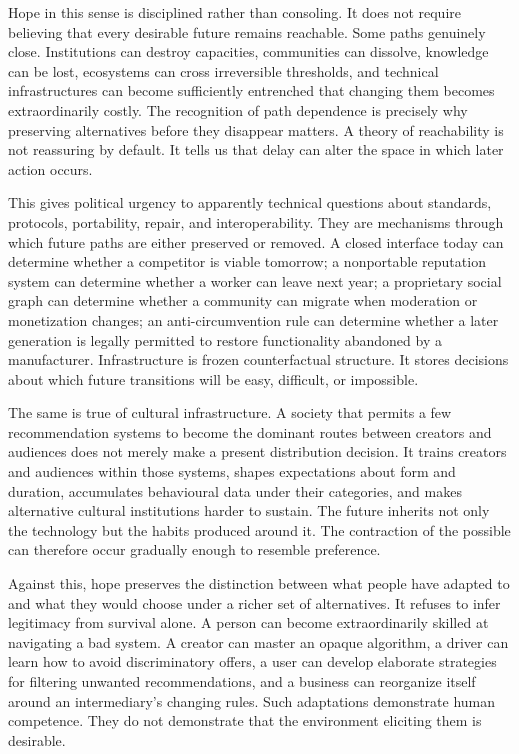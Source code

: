 \documentclass[11pt]{article}
\begin{document}
Hope in this sense is disciplined rather than consoling. It does not require believing that every desirable future remains reachable. Some paths genuinely close. Institutions can destroy capacities, communities can dissolve, knowledge can be lost, ecosystems can cross irreversible thresholds, and technical infrastructures can become sufficiently entrenched that changing them becomes extraordinarily costly. The recognition of path dependence is precisely why preserving alternatives before they disappear matters. A theory of reachability is not reassuring by default. It tells us that delay can alter the space in which later action occurs.

This gives political urgency to apparently technical questions about standards, protocols, portability, repair, and interoperability. They are mechanisms through which future paths are either preserved or removed. A closed interface today can determine whether a competitor is viable tomorrow; a nonportable reputation system can determine whether a worker can leave next year; a proprietary social graph can determine whether a community can migrate when moderation or monetization changes; an anti-circumvention rule can determine whether a later generation is legally permitted to restore functionality abandoned by a manufacturer. Infrastructure is frozen counterfactual structure. It stores decisions about which future transitions will be easy, difficult, or impossible.

The same is true of cultural infrastructure. A society that permits a few recommendation systems to become the dominant routes between creators and audiences does not merely make a present distribution decision. It trains creators and audiences within those systems, shapes expectations about form and duration, accumulates behavioural data under their categories, and makes alternative cultural institutions harder to sustain. The future inherits not only the technology but the habits produced around it. The contraction of the possible can therefore occur gradually enough to resemble preference.

Against this, hope preserves the distinction between what people have adapted to and what they would choose under a richer set of alternatives. It refuses to infer legitimacy from survival alone. A person can become extraordinarily skilled at navigating a bad system. A creator can master an opaque algorithm, a driver can learn how to avoid discriminatory offers, a user can develop elaborate strategies for filtering unwanted recommendations, and a business can reorganize itself around an intermediary's changing rules. Such adaptations demonstrate human competence. They do not demonstrate that the environment eliciting them is desirable.
\end{document}
